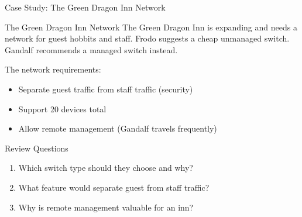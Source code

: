 \documentclass[aspectratio=169]{beamer}  %
\begin{document}
\begin{frame}{Case Study: The Green Dragon Inn Network}
    \begin{casestudy}{The Green Dragon Inn Network}
        The Green Dragon Inn is expanding and needs a network for guest hobbits and staff. Frodo suggests a cheap unmanaged switch. Gandalf recommends a managed switch instead.
        
        \vspace{0.5em}
        The network requirements:
        \begin{itemize}
            \item Separate guest traffic from staff traffic (security)
            \item Support 20 devices total
            \item Allow remote management (Gandalf travels frequently)
        \end{itemize}
    \end{casestudy}
    
    \begin{block}{Review Questions}
        \begin{enumerate}
            \item Which switch type should they choose and why?
            \item What feature would separate guest from staff traffic?
            \item Why is remote management valuable for an inn?
        \end{enumerate}
    \end{block}
\end{frame}
\end{document}
